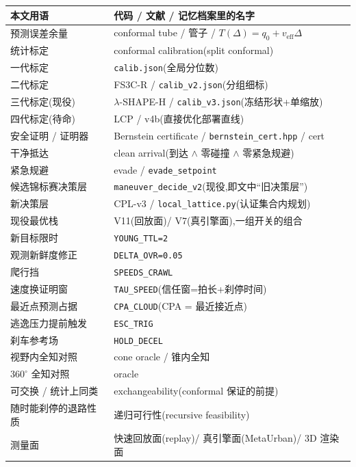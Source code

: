 \documentclass[11pt]{ctexart}
\newcommand{\code}[1]{\texttt{#1}}
\begin{document}
\begin{center}
\small
\begin{tabular}{@{}p{4.6cm}p{9.2cm}@{}}
\toprule
本文用语 & 代码 / 文献 / 记忆档案里的名字 \\
\midrule
预测误差余量 & conformal tube / 管子 / $T(\Delta)=q_0+v_{\text{eff}}\Delta$ \\
统计标定 & conformal calibration(split conformal) \\
一代标定 & \code{calib.json}(全局分位数) \\
二代标定 & FS3C-R / \code{calib\_v2.json}(分组细标) \\
三代标定(现役) & $\lambda$-SHAPE-H / \code{calib\_v3.json}(冻结形状+单缩放) \\
四代标定(待命) & LCP / v4b(直接优化部署直线) \\
安全证明 / 证明器 & Bernstein certificate / \code{bernstein\_cert.hpp} / cert \\
干净抵达 & clean arrival(到达 $\wedge$ 零碰撞 $\wedge$ 零紧急规避) \\
紧急规避 & evade / \code{evade\_setpoint} \\
候选锦标赛决策层 & \code{maneuver\_decide\_v2}(现役,即文中``旧决策层'') \\
新决策层 & CPL-v3 / \code{local\_lattice.py}(认证集合内规划) \\
现役最优栈 & V11(回放面)/ V7(真引擎面),一组开关的组合 \\
新目标限时 & \code{YOUNG\_TTL=2} \\
观测新鲜度修正 & \code{DELTA\_OVR=0.05} \\
爬行挡 & \code{SPEEDS\_CRAWL} \\
速度换证明窗 & \code{TAU\_SPEED}(信任窗=拍长+刹停时间) \\
最近点预测占据 & \code{CPA\_CLOUD}(CPA = 最近接近点) \\
逃逸压力提前触发 & \code{ESC\_TRIG} \\
刹车参考场 & \code{HOLD\_DECEL} \\
视野内全知对照 & cone oracle / 锥内全知 \\
$360^\circ$ 全知对照 & oracle \\
可交换 / 统计上同类 & exchangeability(conformal 保证的前提) \\
随时能刹停的退路性质 & 递归可行性(recursive feasibility) \\
测量面 & 快速回放面(replay)/ 真引擎面(MetaUrban)/ 3D 渲染面 \\
\bottomrule
\end{tabular}
\end{center}
\end{document}
